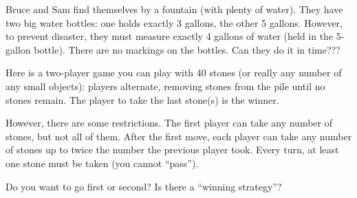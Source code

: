 \documentclass[11pt]{exam}
\begin{document}
\begin{questions}
  \question Bruce and Sam find themselves by a fountain (with plenty of water).  They have two big water bottles: one holds exactly 3 gallons, the other 5 gallons.  However, to prevent disaster, they must measure exactly 4 gallons of water (held in the 5-gallon bottle).  There are no markings on the bottles.  Can they do it in time???

  \clearpage

  \question Here is a two-player game you can play with 40 stones (or really any number of any small objects): players alternate, removing stones from the pile until no stones remain.  The player to take the last stone(s) is the winner.

  However, there are some restrictions.  The first player can take any number of stones, but not all of them.  After the first move, each player can take any number of stones up to twice the number the previous player took.  Every turn, at least one stone must be taken (you cannot ``pass'').

  Do you want to go first or second?  Is there a ``winning strategy''?
\end{questions}
\end{document}
